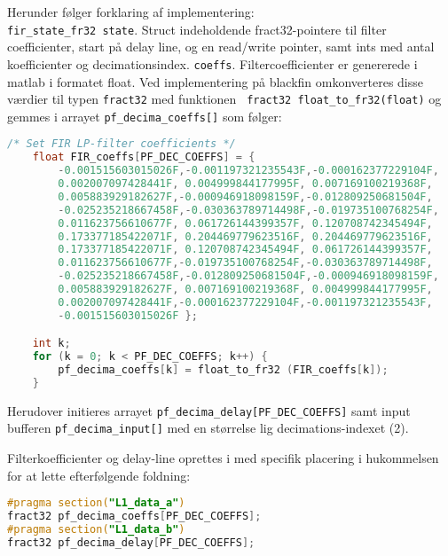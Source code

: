 Herunder følger forklaring af implementering: \\
\verb+fir_state_fr32 state+. Struct indeholdende fract32-pointere til filter coefficienter, start på delay line, og en read/write pointer, samt ints med antal koefficienter og decimationsindex. 
\verb+coeffs+. Filtercoefficienter er genererede i matlab i formatet float. Ved implementering på blackfin omkonverteres disse værdier til typen \verb+fract32+ med funktionen \verb+ fract32 float_to_fr32(float)+ og gemmes i arrayet \verb+pf_decima_coeffs[]+ som følger:
\begin{lstlisting}[language=C,numbers=none]
/* Set FIR LP-filter coefficients */
	float FIR_coeffs[PF_DEC_COEFFS] = {
		-0.001515603015026F,-0.001197321235543F,-0.000162377229104F,
		0.002007097428441F, 0.004999844177995F, 0.007169100219368F,
		0.005883929182627F,-0.000946918098159F,-0.012809250681504F,
		-0.025235218667458F,-0.030363789714498F,-0.019735100768254F,
		0.011623756610677F, 0.061726144399357F, 0.120708742345494F,
		0.173377185422071F, 0.204469779623516F, 0.204469779623516F,
		0.173377185422071F, 0.120708742345494F, 0.061726144399357F,
		0.011623756610677F,-0.019735100768254F,-0.030363789714498F,
		-0.025235218667458F,-0.012809250681504F,-0.000946918098159F,
		0.005883929182627F, 0.007169100219368F, 0.004999844177995F,
		0.002007097428441F,-0.000162377229104F,-0.001197321235543F,
		-0.001515603015026F	};

	int k;
	for (k = 0; k < PF_DEC_COEFFS; k++) {
		pf_decima_coeffs[k] = float_to_fr32 (FIR_coeffs[k]);
	}
\end{lstlisting}
Herudover initieres arrayet \verb+pf_decima_delay[PF_DEC_COEFFS]+ samt input bufferen \verb+pf_decima_input[]+ med en størrelse lig decimations-indexet (2).

Filterkoefficienter og delay-line oprettes i med specifik placering i hukommelsen for at lette efterfølgende foldning:
\begin{lstlisting}[language=C,numbers=none]
#pragma section("L1_data_a")
fract32 pf_decima_coeffs[PF_DEC_COEFFS];
#pragma section("L1_data_b")
fract32 pf_decima_delay[PF_DEC_COEFFS];
\end{lstlisting}

